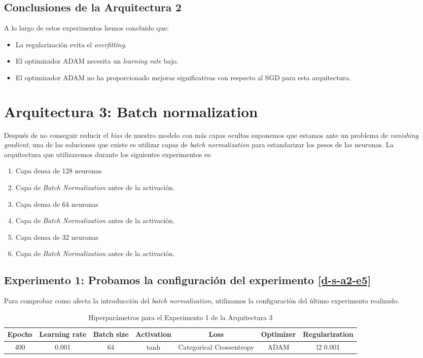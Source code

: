 \documentclass{article}
\begin{document}
		\subsection{Conclusiones de la Arquitectura 2}
		\label{d-cl-a2}
			A lo largo de estos experimentos hemos concluido que:
			\begin{itemize}
				\item La regularizaci\'on evita el \textit{overfitting}.
				\item El optimizador ADAM necesita un \textit{learning rate} bajo.
				\item El optimizador ADAM no ha proporcionado mejoras significativas con respecto al SGD para esta arquitectura.
			\end{itemize}
			
	\section{Arquitectura 3: Batch normalization}
	\label{d-s-a3}
		Despu\'es de no conseguir reducir el \textit{bias} de nuestro modelo con m\'as capas ocultas suponemos que estamos ante un problema de \textit{vanishing gradient}, una de las soluciones que existe es utilizar capas de \textit{batch normalization} para estandarizar los pesos de las neuronas. La arquitectura que utilizaremos durante los siguientes experimentos es:
		\begin{enumerate}
			\item Capa densa de 128 neuronas
			\item Capa de \textit{Batch Normalization} antes de la activaci\'on.
			\item Capa densa de 64 neuronas
			\item Capa de \textit{Batch Normalization} antes de la activaci\'on.
			\item Capa densa de 32 neuronas
			\item Capa de \textit{Batch Normalization} antes de la activaci\'on.
		\end{enumerate}
		
		\subsection{Experimento 1: Probamos la configuraci\'on del experimento \ref{d-s-a2-e5}}
		\label{d-s-a3-e1}
			Para comprobar como afecta la introducci\'on del \textit{batch normalization}, utilizamos la configuraci\'on del \'ultimo experimento realizado.
			
			\begin{table}[!h]
				\begin{tabular}{| c | c | c | c | c | c | c |}
					\textbf{Epochs} & \textbf{Learning rate} & \textbf{Batch size} & \textbf{Activation} & \textbf{Loss} & \textbf{Optimizer} & \textbf{Regularization} \\ \hline
					400 & 0.001 & 64 & tanh & Categorical Crossentropy & ADAM & l2 0.001
				\end{tabular}
				\caption{Hiperpar\'ametros para el Experimento 1 de la Arquitectura 3}
				\label{tab:hip-d-a3-e1}
			\end{table}
			
\end{document}
